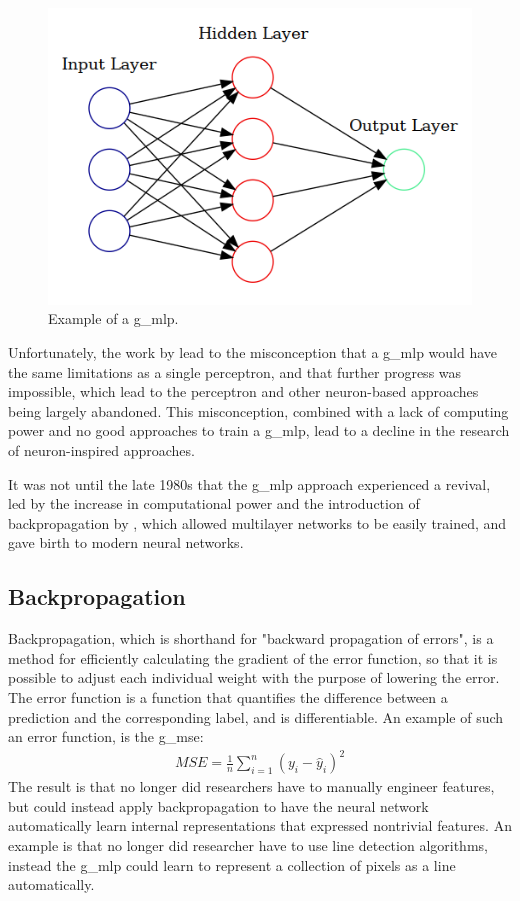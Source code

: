 \par
\begin{figure}[H]
    \centering
    \includegraphics[width=\linewidth]{resources/related_works/mlp.gv.png}
    \caption{Example of a \gls*{g_mlp}.}
    \label{fig:mlp}
\end{figure}
Unfortunately, the work by \textcite{perceptron3} lead to the misconception that a \gls*{g_mlp} would have the same limitations as a single perceptron, and that further progress was impossible, which lead to the perceptron and other neuron-based approaches being largely abandoned\cite{perceptron_misconceptions}. This misconception, combined with a lack of computing power and no good approaches to train a \gls*{g_mlp}, lead to a decline in the research of neuron-inspired approaches.
\par
It was not until the late 1980s\cite{perceptron_misconceptions} that the \gls*{g_mlp} approach experienced a revival, led by the increase in computational power and the introduction of backpropagation by \textcite{backprop}, which allowed multilayer networks to be easily trained, and gave birth to modern neural networks.
\subsection{Backpropagation}
Backpropagation\cite{backprop}, which is shorthand for "backward propagation of errors",  is a method for efficiently calculating the gradient of the error function, so that it is possible to adjust each individual weight with the purpose of lowering the error. The error function is a function that quantifies the difference between a prediction and the corresponding label, and is differentiable. An example of such an error function, is the \gls*{g_mse}:
\begin{align*}
    MSE=\frac{1}{n}\sum_{i=1}^n (y_i-\hat{y}_i)^2
\end{align*}
The result is that no longer did researchers have to manually engineer features, but could instead apply backpropagation to have the neural network automatically learn internal representations that expressed nontrivial features. An example is that no longer did researcher have to use line detection algorithms, instead the \gls*{g_mlp} could learn to represent a collection of pixels as a line automatically.

